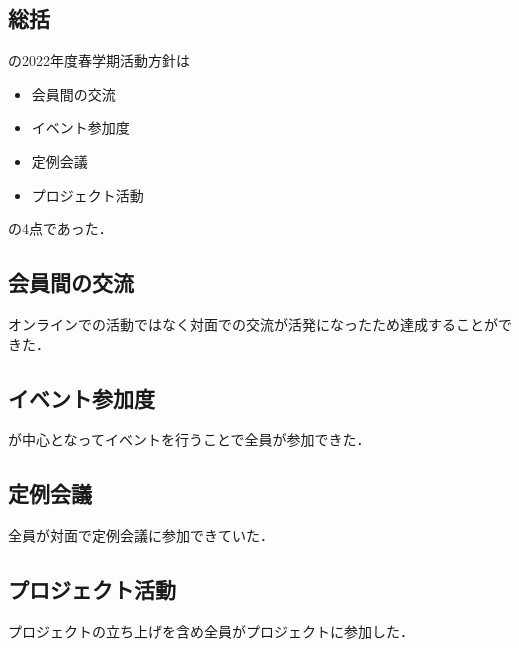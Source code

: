 \subsection*{\secondGrade{}総括}


\secondGrade{}の2022年度春学期活動方針は
\begin{itemize}
    \item 会員間の交流
    \item イベント参加度
    \item 定例会議
    \item プロジェクト活動
\end{itemize}
の4点であった．

\subsection*{会員間の交流}
オンラインでの活動ではなく対面での交流が活発になったため達成することができた．

\subsection*{イベント参加度}
\secondGrade{}が中心となってイベントを行うことで全員が参加できた．

\subsection*{定例会議}
全員が対面で定例会議に参加できていた．

\subsection*{プロジェクト活動}
プロジェクトの立ち上げを含め全員がプロジェクトに参加した．
